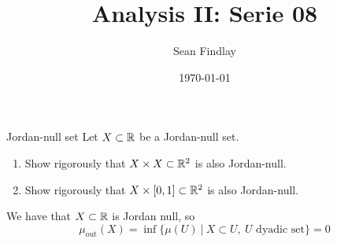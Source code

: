 \documentclass[12pt]{article}
\title{Analysis II: Serie 08}
\author{Sean Findlay}
\date{\today}
\begin{document}
\maketitle

\begin{problem}{Jordan-null set}{}
    Let $X \subset \mathbb{R}$ be a Jordan-null set.

    \begin{enumerate}[label=\alph*)]
        \item Show rigorously that $X \times X \subset \mathbb{R}^2$ is also Jordan-null.
        \item Show rigorously that $X \times [0, 1] \subset \mathbb{R}^2$ is also Jordan-null.
    \end{enumerate}
\end{problem}

We have that $X \subset \mathbb{R}$ is Jordan null, so
$$
\mu_{\text{out}}(X) = \inf \{\mu(U) \ |\ X \subset U,\ U \text{ dyadic set}\} = 0
$$
\end{document}
